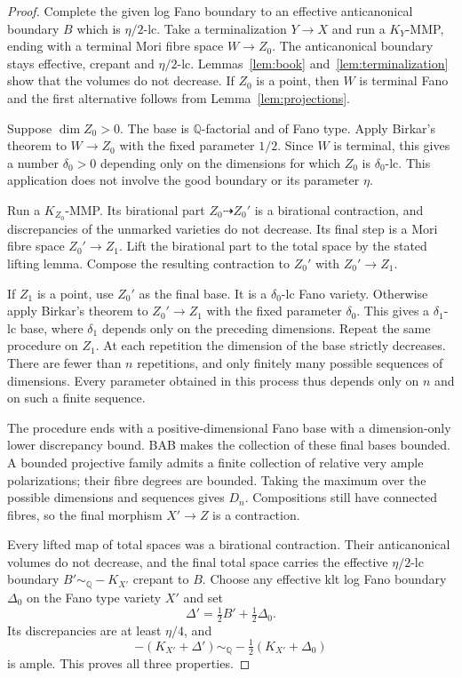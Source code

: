 \documentclass[11pt,reqno]{amsart}
\numberwithin{equation}{section}
\theoremstyle{definition}
\theoremstyle{remark}
\newcommand{\Q}{\mathbb Q}
\newcommand{\simq}{\sim_{\Q}}
\begin{document}
\begin{proof}
Complete the given log Fano boundary to an effective anticanonical boundary $B$ which is $\eta/2$-lc. Take a terminalization $Y\to X$ and run a $K_Y$-MMP, ending with a terminal Mori fibre space $W\to Z_0$. The anticanonical boundary stays effective, crepant and $\eta/2$-lc. Lemmas~\ref{lem:book} and~\ref{lem:terminalization} show that the volumes do not decrease. If $Z_0$ is a point, then $W$ is terminal Fano and the first alternative follows from Lemma~\ref{lem:projections}.

Suppose $\dim Z_0>0$. The base is $\Q$-factorial and of Fano type. Apply Birkar's theorem to $W\to Z_0$ with the fixed parameter $1/2$. Since $W$ is terminal, this gives a number $\delta_0>0$ depending only on the dimensions for which $Z_0$ is $\delta_0$-lc. This application does not involve the good boundary or its parameter $\eta$.

Run a $K_{Z_0}$-MMP. Its birational part $Z_0\dashrightarrow Z_0'$ is a birational contraction, and discrepancies of the unmarked varieties do not decrease. Its final step is a Mori fibre space $Z_0'\to Z_1$. Lift the birational part to the total space by the stated lifting lemma. Compose the resulting contraction to $Z_0'$ with $Z_0'\to Z_1$.

If $Z_1$ is a point, use $Z_0'$ as the final base. It is a $\delta_0$-lc Fano variety. Otherwise apply Birkar's theorem to $Z_0'\to Z_1$ with the fixed parameter $\delta_0$. This gives a $\delta_1$-lc base, where $\delta_1$ depends only on the preceding dimensions. Repeat the same procedure on $Z_1$. At each repetition the dimension of the base strictly decreases. There are fewer than $n$ repetitions, and only finitely many possible sequences of dimensions. Every parameter obtained in this process thus depends only on $n$ and on such a finite sequence.

The procedure ends with a positive-dimensional Fano base with a dimension-only lower discrepancy bound. BAB makes the collection of these final bases bounded. A bounded projective family admits a finite collection of relative very ample polarizations; their fibre degrees are bounded. Taking the maximum over the possible dimensions and sequences gives $D_n$. Compositions still have connected fibres, so the final morphism $X'\to Z$ is a contraction.

Every lifted map of total spaces was a birational contraction. Their anticanonical volumes do not decrease, and the final total space carries the effective $\eta/2$-lc boundary $B'\simq-K_{X'}$ crepant to $B$. Choose any effective klt log Fano boundary $\Delta_0$ on the Fano type variety $X'$ and set
\[
 \Delta'=\tfrac12B'+\tfrac12\Delta_0.
\]
Its discrepancies are at least $\eta/4$, and
\[
 -(K_{X'}+\Delta')\simq-\tfrac12(K_{X'}+\Delta_0)
\]
is ample. This proves all three properties.
\end{proof}
\end{document}
